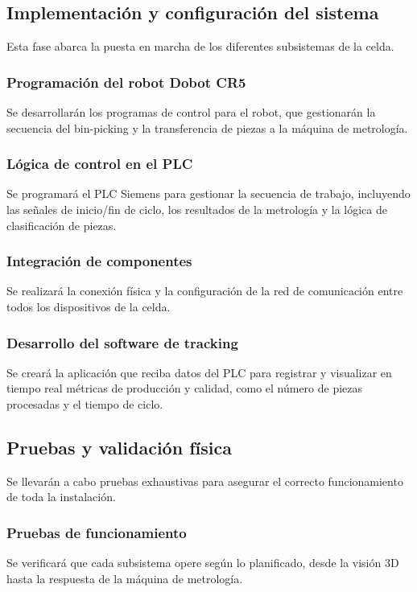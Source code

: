 \documentclass[12pt, a4paper]{article}
\begin{document}
\subsection{Implementación y configuración del sistema}
Esta fase abarca la puesta en marcha de los diferentes subsistemas de la celda.

\subsubsection{Programación del robot Dobot CR5}
Se desarrollarán los programas de control para el robot, que gestionarán la secuencia del bin-picking y la transferencia de piezas a la máquina de metrología.

\subsubsection{Lógica de control en el PLC}
Se programará el PLC Siemens para gestionar la secuencia de trabajo, incluyendo las señales de inicio/fin de ciclo, los resultados de la metrología y la lógica de clasificación de piezas.

\subsubsection{Integración de componentes}
Se realizará la conexión física y la configuración de la red de comunicación entre todos los dispositivos de la celda.

\subsubsection{Desarrollo del software de tracking}
Se creará la aplicación que reciba datos del PLC para registrar y visualizar en tiempo real métricas de producción y calidad, como el número de piezas procesadas y el tiempo de ciclo.

\subsection{Pruebas y validación física}
Se llevarán a cabo pruebas exhaustivas para asegurar el correcto funcionamiento de toda la instalación.

\subsubsection{Pruebas de funcionamiento}
Se verificará que cada subsistema opere según lo planificado, desde la visión 3D hasta la respuesta de la máquina de metrología.
\end{document}
